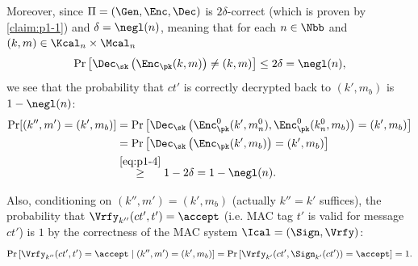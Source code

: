 \begin{answer}
        Moreover,  since $\Pi=(\Gen, \Enc,\Dec)$ is $2\delta$-correct (which is proven by \autoref{claim:p1-1}) and  $\delta=\negl(n)$, meaning that for each $n\in\Nbb$ and $(k,m)\in\Kcal_n\times \Mcal_n$
        \begin{equation}\label{eq:p1-4}
            \Pr\left[\Dec_\sk\left(\Enc_\pk(k,m)\right)\neq (k,m)\right] \le 2\delta = \negl(n),
        \end{equation}
        we see that the probability that $ct'$ is correctly decrypted back to $(k', m_b)$ is $1-\negl(n)$:
        \begin{align}\label{eq:p1-6}
            \Pr[(k'', m')=(k', m_b)]
            &= \Pr\left[\Dec_\sk\left(\Enc^0_\pk(k', m^0_n), \Enc^0_\pk(k^0_n, m_b)\right)=(k', m_b)\right]\notag\\
            &= \Pr\left[\Dec_\sk\left(\Enc_\pk(k', m_b)\right)=(k', m_b)\right]\notag\\
            &\stackrel{\eqref{eq:p1-4}}\ge 1-2\delta = 1-\negl(n).
        \end{align}

        Also, conditioning on $(k'', m')=(k', m_b)$ (actually $k''=k'$ suffices), the probability that $\Vrfy_{k''}(ct',t')=\accept$ (i.e. MAC tag $t'$ is valid for message $ct'$) is $1$ by the correctness of the MAC system $\Ical=(\Sign, \Vrfy)$:
        \begin{equation}\label{eq:p1-7}
            \Pr\left[\Vrfy_{k''}(ct',t')=\accept \mid (k'', m')=(k', m_b) \right]
            = \Pr\left[\Vrfy_{k'}(ct',\Sign_{k'}(ct'))=\accept \right] =1.
        \end{equation}
    

\end{answer}

